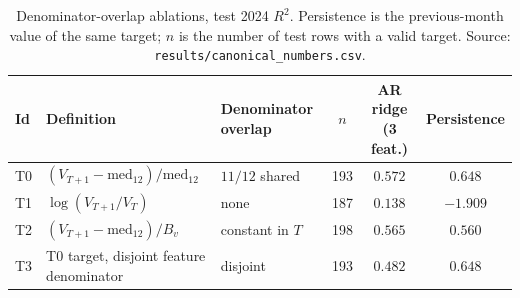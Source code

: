 \documentclass[10pt]{article}
\begin{document}
\begin{table}[!h]
\centering
\caption{Denominator-overlap ablations, test 2024 $R^2$. Persistence is the previous-month value of the same target; $n$ is the number of test rows with a valid target. Source: \texttt{results/canonical\_numbers.csv}.}
\label{tab:t2t3}
\footnotesize
\begin{tabular}{l l l c cc}
\toprule
\textbf{Id} & \textbf{Definition} & \textbf{Denominator overlap} & $n$ & \textbf{AR ridge (3 feat.)} & \textbf{Persistence} \\
\midrule
T0 & $(V_{T+1}-\mathrm{med}_{12})/\mathrm{med}_{12}$ & $11/12$ shared & 193 & $0.572$ & $0.648$ \\
T1 & $\log(V_{T+1}/V_T)$ & none & 187 & $0.138$ & $-1.909$ \\
T2 & $(V_{T+1}-\mathrm{med}_{12})/B_v$ & constant in $T$ & 198 & $0.565$ & $0.560$ \\
T3 & T0 target, disjoint feature denominator & disjoint & 193 & $0.482$ & $0.648$ \\
\bottomrule
\end{tabular}
\end{table}
\end{document}
